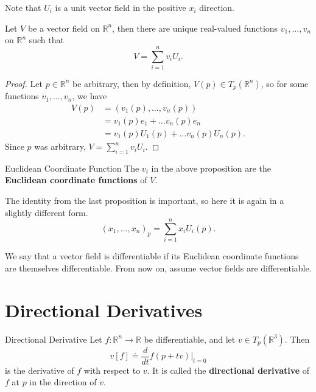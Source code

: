 \documentclass[10pt]{report}
\begin{document}
Note that $U_i$ is a unit vector field in the positive $x_i$ direction.

\begin{prop}
	Let $V$ be a vector field on $\mathbb{R}^n$, then there are unique real-valued functions $v_1, \dots, v_n$ on $\mathbb{R}^n$ such that
	\[
	V = \sum_{i=1}^{n} v_i U_i.
	\] 
\end{prop}
\begin{proof}
	Let $p \in \mathbb{R}^n$ be arbitrary, then by definition, $V(p) \in T_p(\mathbb{R}^n)$, so for some functions $v_1, \dots, v_n$, we have
	\begin{align*}
		V(p) &= (v_1(p), \dots, v_n(p)) \\
		     &= v_1(p)e_1 + \dots v_n(p)e_n \\
		     &= v_1(p) U_1(p) + \dots v_n(p) U_n(p).
	\end{align*}
	Since $p$ was arbitrary, $V = \sum_{i=1}^{n} v_i U_i$.
\end{proof}

\begin{defn}{Euclidean Coordinate Function}{}
	The $v_i$ in the above proposition are the \textbf{Euclidean coordinate functions} of $V$.
\end{defn}

The identity from the last proposition is important, so here it is again in a slightly different form.
\[
	(x_1, \dots, x_n)_p = \sum_{i=1}^{n} x_i U_i(p).
\] 

\begin{note}{}{}
	We say that a vector field is differentiable if its Euclidean coordinate functions are themselves differentiable. From now on, assume vector fields are differentiable.
\end{note}



\section{Directional Derivatives}

\begin{defn}{Directional Derivative}{}
	Let $f:\mathbb{R}^n \to \mathbb{R}$ be differentiable, and let $v \in T_p(\mathbb{R}^3)$. Then
	\[
		v[f] \doteq \frac{d }{d t} f(p+tv) \Big|_{t=0}
\] is the derivative of $f$ with respect to $v$. It is called the \textbf{directional derivative} of $f$ at $p$ in the direction of $v$.
\end{defn}
\end{document}

